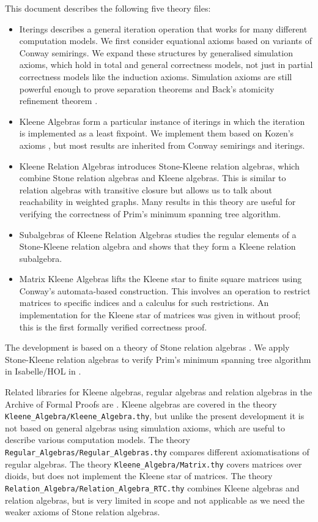 \documentclass[11pt,a4paper]{article}
\begin{document}
This document describes the following five theory files:
\begin{itemize}
\item Iterings describes a general iteration operation that works for many different computation models.
      We first consider equational axioms based on variants of Conway semirings.
      We expand these structures by generalised simulation axioms, which hold in total and general correctness models, not just in partial correctness models like the induction axioms.
      Simulation axioms are still powerful enough to prove separation theorems and Back's atomicity refinement theorem \cite{BackWright1999}.
\item Kleene Algebras form a particular instance of iterings in which the iteration is implemented as a least fixpoint.
      We implement them based on Kozen's axioms \cite{Kozen1994}, but most results are inherited from Conway semirings and iterings.
\item Kleene Relation Algebras introduces Stone-Kleene relation algebras, which combine Stone relation algebras and Kleene algebras.
      This is similar to relation algebras with transitive closure \cite{Ng1984} but allows us to talk about reachability in weighted graphs.
      Many results in this theory are useful for verifying the correctness of Prim's minimum spanning tree algorithm.
\item Subalgebras of Kleene Relation Algebras studies the regular elements of a Stone-Kleene relation algebra and shows that they form a Kleene relation subalgebra.
\item Matrix Kleene Algebras lifts the Kleene star to finite square matrices using Conway's automata-based construction.
      This involves an operation to restrict matrices to specific indices and a calculus for such restrictions.
      An implementation for the Kleene star of matrices was given in \cite{Asplund2014} without proof; this is the first formally verified correctness proof.
\end{itemize}
The development is based on a theory of Stone relation algebras \cite{Guttmann2017a,Guttmann2017b}.
We apply Stone-Kleene relation algebras to verify Prim's minimum spanning tree algorithm in Isabelle/HOL in \cite{Guttmann2016c}.

Related libraries for Kleene algebras, regular algebras and relation algebras in the Archive of Formal Proofs are \cite{ArmstrongFosterStruthWeber2016,ArmstrongGomesStruthWeber2016,FosterStruth2016}.
Kleene algebras are covered in the theory \texttt{Kleene\_Algebra/Kleene\_Algebra.thy}, but unlike the present development it is not based on general algebras using simulation axioms, which are useful to describe various computation models.
The theory \texttt{Regular\_Algebras/Regular\_Algebras.thy} compares different axiomatisations of regular algebras.
The theory \texttt{Kleene\_Algebra/Matrix.thy} covers matrices over dioids, but does not implement the Kleene star of matrices.
The theory \texttt{Relation\_Algebra/Relation\_Algebra\_RTC.thy} combines Kleene algebras and relation algebras, but is very limited in scope and not applicable as we need the weaker axioms of Stone relation algebras.

\begin{flushleft}

\end{flushleft}



\end{document}
